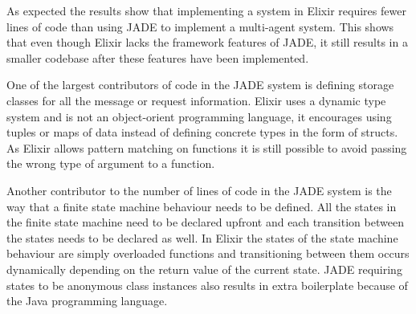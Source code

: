 As expected the results show that implementing a system in Elixir requires fewer lines of code than using JADE to implement a multi-agent system.
This shows that even though Elixir lacks the framework features of JADE, it still results in a smaller codebase after these features have been implemented.

One of the largest contributors of code in the JADE system is defining storage classes for all the message or request information.
Elixir uses a dynamic type system and is not an object-orient programming language, it encourages using tuples or maps of data instead of defining concrete types in the form of structs.
As Elixir allows pattern matching on functions it is still possible to avoid passing the wrong type of argument to a function.

Another contributor to the number of lines of code in the JADE system is the way that a finite state machine behaviour needs to be defined.
All the states in the finite state machine need to be declared upfront and each transition between the states needs to be declared as well.
In Elixir the states of the state machine behaviour are simply overloaded functions and transitioning between them occurs dynamically depending on the return value of the current state.
JADE requiring states to be anonymous class instances also results in extra boilerplate because of the Java programming language.

